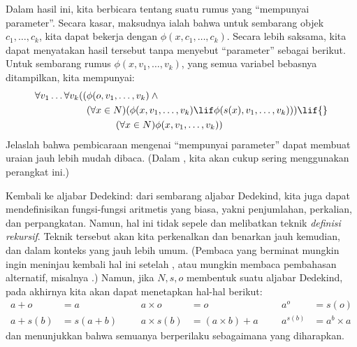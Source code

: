 \documentclass[../../../include/open-logic-section]{subfiles}
\begin{document}
Dalam hasil ini, kita berbicara tentang suatu rumus yang ``mempunyai
parameter''. Secara kasar, maksudnya ialah bahwa untuk sembarang objek
$c_1, \ldots, c_k$, kita dapat bekerja dengan
$\phi(x, c_1, \ldots, c_k)$. Secara lebih saksama, kita dapat menyatakan
hasil tersebut tanpa menyebut ``parameter'' sebagai berikut. Untuk sembarang
rumus $\phi(x, v_1, \ldots, v_k)$, yang semua variabel bebasnya ditampilkan,
kita mempunyai:
	\begin{align*}
			\forall v_1 \ldots \forall v_k((&\phi(o, v_1,\ldots, v_k) \land {}\\
			&	(\forall x \in N)(\phi(x,v_1, \ldots, v_k) \lif \phi(s(x), v_1,\ldots, v_k))) \lif {}\\
			&\hspace{3em} (\forall x \in N)\phi(x, v_1,\ldots, v_k))
	\end{align*}
Jelaslah bahwa pembicaraan mengenai ``mempunyai parameter'' dapat membuat
uraian jauh lebih mudah dibaca. (Dalam , kita akan cukup
sering menggunakan perangkat ini.)

Kembali ke aljabar Dedekind: dari sembarang aljabar Dedekind, kita juga dapat
mendefinisikan fungsi-fungsi aritmetis yang biasa, yakni penjumlahan,
perkalian, dan perpangkatan. Namun, hal ini tidak sepele dan melibatkan
teknik \emph{definisi rekursif}. Teknik tersebut akan kita perkenalkan dan
benarkan jauh kemudian, dan dalam konteks yang jauh lebih umum. (Pembaca
yang berminat mungkin ingin meninjau kembali hal ini setelah
, atau mungkin membaca pembahasan
alternatif, misalnya \citealt[pp.~95--8]{Potter2004}.) Namun, jika
$N, s, o$ membentuk suatu aljabar Dedekind, pada akhirnya kita akan dapat
menetapkan hal-hal berikut:
\begin{align*}
	{a} + {o} &= {a} & & & {a} \times {o} &= {o} & & & {a}^{o} &= s(o)\\
{a} + {s}({b}) &= {s}({a}+{b}) &&& {a} \times {s}({b}) &= ({a}\times {b}) + {a}  & & & {a}^{{s}({b})} &= {a}^{b} \times {a}
\end{align*}
dan menunjukkan bahwa semuanya berperilaku sebagaimana yang diharapkan.
\end{document}
